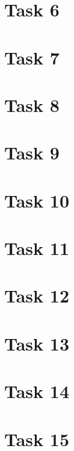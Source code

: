 \documentclass[a4paper,12pt,oneside,onecolumn]{article} %
\begin{document}


\section*{Task 6}



\section*{Task 7}



\section*{Task 8}



\section*{Task 9}



\section*{Task 10}



\section*{Task 11}



\section*{Task 12}



\section*{Task 13}



\section*{Task 14}



\section*{Task 15}
\end{document}
